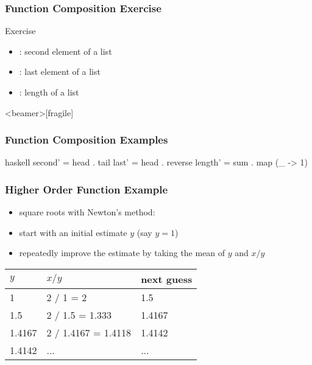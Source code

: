 \documentclass[dvipsnames]{beamer}
\theoremstyle{plain}
\begin{document}
\begin{frame}[fragile]
  \frametitle{Function Composition Exercise}

  \begin{block}{Exercise}
    \begin{itemize}
      \item {}: second element of a list
      \item {}: last element of a list
      \item {}: length of a list
    \end{itemize}
  \end{block}
\end{frame}

\begin{frame}<beamer>[fragile]
  \frametitle{Function Composition Examples}

  \begin{example}[Haskell]
    \begin{pygments}{haskell}
second' = head . tail
last' = head . reverse
length' = sum . map (\_ -> 1)
    \end{pygments}
  \end{example}
\end{frame}

\begin{frame}[fragile]
  \frametitle{Higher Order Function Example}

  \begin{example}
    \begin{itemize}
      \item square roots with Newton's method:

      \medskip
      \item start with an initial estimate $y$ (say $y = 1$)
      \item repeatedly improve the estimate by taking the mean of $y$
        and $x / y$
    \end{itemize}

    \pause
    \medskip
    \begin{center}
    \begin{tabular}{lll}
      $y$      & $x / y$             & next guess\\\hline
      1        & 2 / 1 = 2           & 1.5\\
      1.5      & 2 / 1.5 = 1.333     & 1.4167\\
      1.4167   & 2 / 1.4167 = 1.4118 & 1.4142\\
      1.4142   & ...                 & ...
    \end{tabular}
    \end{center}
  \end{example}
\end{frame}
\end{document}
